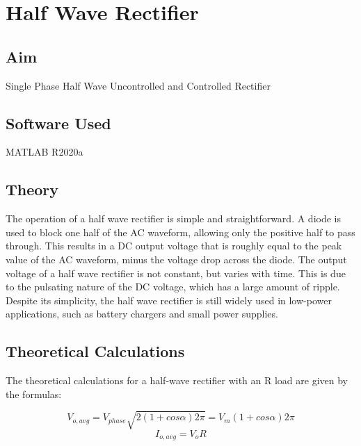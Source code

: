 \chapter{Half Wave Rectifier}
\vspace{-1cm}

\section{Aim}
\hspace{1cm}Single Phase Half Wave Uncontrolled and Controlled Rectifier

\section{Software Used}
\hspace{1cm}MATLAB R2020a
\section{Theory}
\hspace{\parindent}

The operation of a half wave rectifier is simple and straightforward. A diode is used to block one half of the AC waveform, allowing only the positive half to pass through. This results in a DC output voltage that is roughly equal to the peak value of the AC waveform, minus the voltage drop across the diode. The output voltage of a half wave rectifier is not constant, but varies with time. This is due to the pulsating nature of the DC voltage, which has a large amount of ripple. Despite its simplicity, the half wave rectifier is still widely used in low-power applications, such as battery chargers and small power supplies.



\section{Theoretical Calculations}
\hspace{\parindent}
The theoretical calculations for a half-wave rectifier with an R load are given by the formulas:


$$
    V_{o,avg} =
    V_{phase}
    \sqrt{2(1 + cos\alpha)2\pi} =
    V_m(1 + cos\alpha)
    2\pi
$$
$$
    I_{o,avg} =
    V_oR
$$

